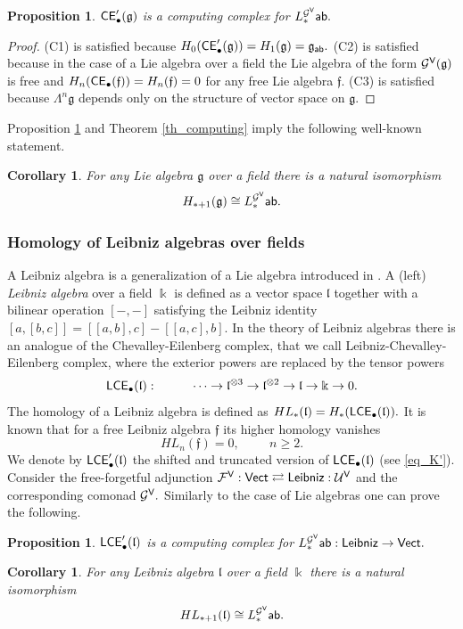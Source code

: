 \documentclass{amsart}
\numberwithin{equation}{section}
\newtheorem{corollary}[theorem]{Corollary}
\newtheorem{proposition}[theorem]{Proposition}
\theoremstyle{definition}
\def\FF{\mathcal{F}}
\def\GG{\mathcal{G}}
\def\UU{\mathcal{U}}
\def\gg{\mathfrak{g}}
\def\ff{\mathfrak{f}}
\def\ll{\mathfrak{l}}
\def\kk{\Bbbk}
\begin{document}
\begin{proposition}\label{prop_computing_CE}
 ${\sf CE}'_\bullet(\gg)$ is a computing complex for $L_*^{\GG^{\sf V}} {\sf ab}.$
\end{proposition}
\begin{proof}
(C1) is satisfied because $H_0({\sf CE}'_\bullet(\gg))=H_1(\gg)=\gg_{\sf ab}.$ (C2) is satisfied because in the case of a Lie algebra over a field the Lie algebra of the form $\GG^{\sf V}(\gg)$ is free and $H_n({\sf CE}_\bullet(\ff))=H_n(\ff)=0$ for any free Lie algebra $\ff$. (C3) is satisfied because $\Lambda^n \gg$ depends only on the structure of vector space on $\gg.$
\end{proof}

Proposition \ref{prop_computing_CE} and Theorem \ref{th_computing} imply the following well-known statement.
\begin{corollary} For any Lie algebra $\gg$ over a field there is a natural isomorphism
$$H_{*+1}(\gg)\cong L^{\GG^{\sf V}}_*{\sf ab}.$$
\end{corollary}

\subsubsection{Homology of Leibniz algebras over fields} A Leibniz algebra is a generalization of a Lie algebra introduced in \cite{loday1993universal}.
A (left) \emph{Leibniz algebra} over a field $\kk$ is defined as  a vector space $\ll$ together with a bilinear operation $[-,-]$ satisfying the Leibniz identity $[a,[b,c]]=[[a,b],c] - [[a,c],b].$
In the theory of Leibniz algebras there is an analogue of the Chevalley-Eilenberg complex, that we call Leibniz-Chevalley-Eilenberg complex, where the exterior powers are replaced by the  tensor powers 
$${\sf LCE_\bullet(\ll)} : \hspace{1cm} \dots \to  \ll^{\otimes 3} \to \ll^{\otimes 2} \to \ll \to \kk \to 0.$$
The homology of a Leibniz algebra is defined as 
$HL_*(\ll)=H_*({\sf LCE}_\bullet(\ll)).$
It is known that for a free Leibniz algebra $\ff$ its higher homology vanishes \cite[Cor. 3.5]{loday1993universal}
$$HL_n(\ff)=0, \hspace{1cm} n\geq 2.$$
We denote by ${\sf LCE}'_\bullet(\ll)$ the shifted and truncated version of ${\sf LCE}_\bullet(\ll)$ (see \eqref{eq_K'}). Consider the free-forgetful adjunction $\FF^{\sf V}:{\sf Vect} \rightleftarrows {\sf Leibniz} : \UU^{\sf V}$ and the corresponding comonad $\GG^{\sf V}.$ Similarly to the case of Lie algebras one can prove the following.
\begin{proposition}
${\sf LCE}'_\bullet(\ll)$ is a computing complex for 
$L_*^{\GG^{\sf V}} {\sf ab}: {\sf Leibniz}\to {\sf Vect}.$
\end{proposition}
\begin{corollary} For any Leibniz algebra $\ll$ over a field $\kk$ there is a natural isomorphism
$$HL_{*+1}(\ll)\cong L^{\GG^{\sf V}}_*{\sf ab}.$$
\end{corollary}
\end{document}
